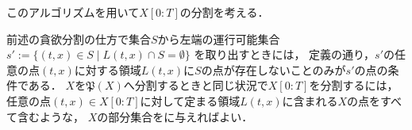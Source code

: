このアルゴリズムを用いて$X[0:T]$の分割を考える．

前述の貪欲分割の仕方で集合$S$から左端の運行可能集合
$s' := \{ (t, x) \in S \mid L(t, x) \cap S = \emptyset \}$
を取り出すときには，
定義の通り，$s'$の任意の点$(t, x)$に対する領域$L(t, x)$に$S$の点が存在しないことのみが$s'$の点の条件である．
$X$を$\mathfrak{P}(X)$へ分割するときと同じ状況で$X[0:T]$を分割するには，
任意の点$(t, x) \in X[0:T]$に対して定まる領域$L(t, x)$に含まれる$X$の点をすべて含むような，
$X$の部分集合を{\setPartitionAlgorithm}に与えればよい．








